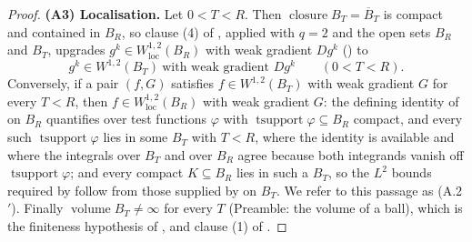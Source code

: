 \begin{proof}
\textbf{(A3) Localisation.}  Let $0<T<R$.  Then $\operatorname{closure}B_T
=\overline B_T$ is compact and contained in $B_R$, so clause (4) of
, applied with $q=2$ and the open sets $B_R$ and
$B_T$, upgrades $g^k\in W^{1,2}_{\mathrm{loc}}(B_R)$ with weak gradient $Dg^k$
() to
\[
g^k\in W^{1,2}(B_T)\ \text{with weak gradient }Dg^k\qquad(0<T<R).
\tag{A.2}
\]
Conversely, if a pair $(f,G)$ satisfies $f\in W^{1,2}(B_T)$ with weak gradient
$G$ for every $T<R$, then $f\in W^{1,2}_{\mathrm{loc}}(B_R)$ with weak gradient
$G$: the defining identity of  on $B_R$ quantifies
over test functions $\varphi$ with $\operatorname{tsupport}\varphi\subseteq B_R$
compact, and every such $\operatorname{tsupport}\varphi$ lies in some $B_T$ with
$T<R$, where the identity is available and where the integrals over $B_T$ and
over $B_R$ agree because both integrands vanish off
$\operatorname{tsupport}\varphi$; and every compact $K\subseteq B_R$ lies in such
a $B_T$, so the $L^2$ bounds required by  follow from those
supplied by  on $B_T$.  We refer to this passage as (A.2$'$).
Finally $\operatorname{volume}B_T\ne\infty$ for every $T$ (Preamble: the volume
of a ball), which is the finiteness hypothesis of
,  and clause (1)
of .


\end{proof}
